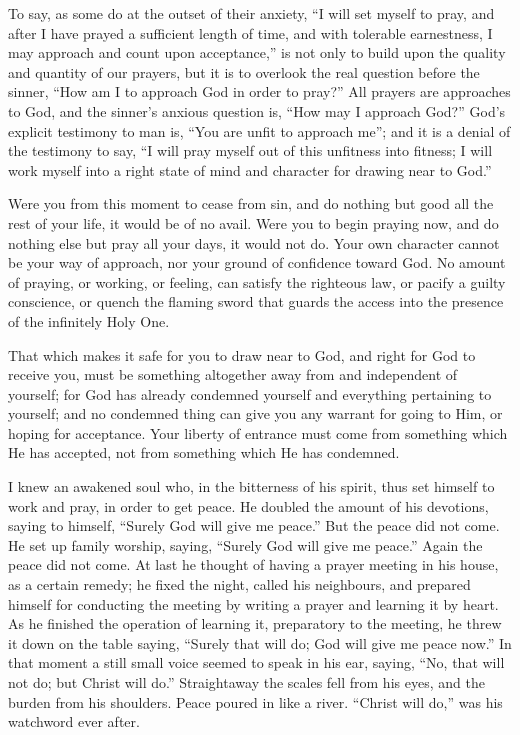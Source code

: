 \documentclass[
]{book}
\begin{document}
To say, as some do at the outset of their anxiety, ``I will set myself to pray, and after I have prayed a sufficient length of time, and with tolerable earnestness, I may approach and count upon acceptance,'' is not only to build upon the quality and quantity of our prayers, but it is to overlook the real question before the sinner, ``How am I to approach God in order to pray?'' All prayers are approaches to God, and the sinner's anxious question is, ``How may I approach God?'' God's explicit testimony to man is, ``You are unfit to approach me''; and it is a denial of the testimony to say, ``I will pray myself out of this unfitness into fitness; I will work myself into a right state of mind and character for drawing near to God.''

Were you from this moment to cease from sin, and do nothing but good all the rest of your life, it would be of no avail. Were you to begin praying now, and do nothing else but pray all your days, it would not do. Your own character cannot be your way of approach, nor your ground of confidence toward God. No amount of praying, or working, or feeling, can satisfy the righteous law, or pacify a guilty conscience, or quench the flaming sword that guards the access into the presence of the infinitely Holy One.

That which makes it safe for you to draw near to God, and right for God to receive you, must be something altogether away from and independent of yourself; for God has already condemned yourself and everything pertaining to yourself; and no condemned thing can give you any warrant for going to Him, or hoping for acceptance. Your liberty of entrance must come from something which He has accepted, not from something which He has condemned.

I knew an awakened soul who, in the bitterness of his spirit, thus set himself to work and pray, in order to get peace. He doubled the amount of his devotions, saying to himself, ``Surely God will give me peace.'' But the peace did not come. He set up family worship, saying, ``Surely God will give me peace.'' Again the peace did not come. At last he thought of having a prayer meeting in his house, as a certain remedy; he fixed the night, called his neighbours, and prepared himself for conducting the meeting by writing a prayer and learning it by heart. As he finished the operation of learning it, preparatory to the meeting, he threw it down on the table saying, ``Surely that will do; God will give me peace now.'' In that moment a still small voice seemed to speak in his ear, saying, ``No, that will not do; but Christ will do.'' Straightaway the scales fell from his eyes, and the burden from his shoulders. Peace poured in like a river. ``Christ will do,'' was his watchword ever after.
\end{document}
